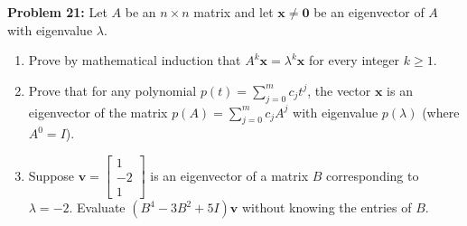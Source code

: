 \documentclass[11pt, letterpaper]{article}
\theoremstyle{definition}
\theoremstyle{remark}
\begin{document}
\vspace{0.4em}
\textbf{Problem 21:}
Let $A$ be an $n \times n$ matrix and let $\mathbf{x} \neq \mathbf{0}$ be an eigenvector of $A$ with eigenvalue $\lambda$.
\begin{enumerate}[label=(\alph*)]
    \item Prove by mathematical induction that $A^k \mathbf{x} = \lambda^k \mathbf{x}$ for every integer $k \ge 1$.
    \item Prove that for any polynomial $p(t) = \sum_{j=0}^{m} c_j t^j$, the vector $\mathbf{x}$ is an eigenvector of the matrix $p(A) = \sum_{j=0}^{m} c_j A^j$ with eigenvalue $p(\lambda)$ (where $A^0 = I$).
    \item Suppose $\mathbf{v} = \begin{bmatrix} 1 \\ -2 \\ 1 \end{bmatrix}$ is an eigenvector of a matrix $B$ corresponding to $\lambda = -2$. Evaluate $(B^4 - 3B^2 + 5I)\mathbf{v}$ without knowing the entries of $B$.
\end{enumerate}
\end{document}
